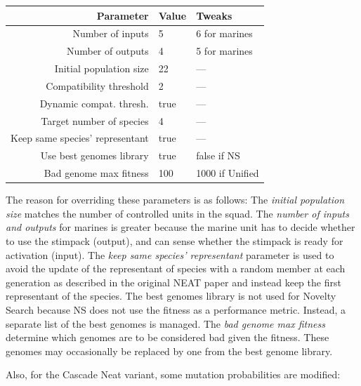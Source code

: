 \begin{tabular}{rll}
    \toprule
    Parameter & Value & Tweaks \\
    \midrule
    Number of inputs & 5 & 6 for marines \\
    Number of outputs & 4 & 5 for marines \\
    Initial population size & 22  & — \\[1ex]

    Compatibility threshold & 2 & — \\
    Dynamic compat. thresh. & true & — \\
    Target number of species & 4 & — \\
    Keep same species' representant & true & — \\[1ex]

    Use best genomes library & true & false if NS \\
    Bad genome max fitness & 100 & 1000 if Unified \\
    \bottomrule
\end{tabular}

The reason for overriding these parameters is as follows: The
\emph{initial population size} matches the number of controlled units
in the squad.  The \emph{number of inputs and outputs} for marines is
greater because the marine unit has to decide whether to use the
stimpack (output), and can sense whether the stimpack is ready for
activation (input). The \emph{keep same species' representant}
parameter is used to avoid the update of the representant of species
with a random member at each generation as described in the original
NEAT paper and instead keep the first representant of the species. The
best genomes library is not used for Novelty Search because NS does
not use the fitness as a performance metric. Instead, a separate list
of the best genomes is managed. The \emph{bad genome max fitness}
determine which genomes are to be considered bad given the
fitness. These genomes may occasionally be replaced by one from the
best genome library.


Also, for the Cascade Neat variant, some mutation probabilities are modified:

